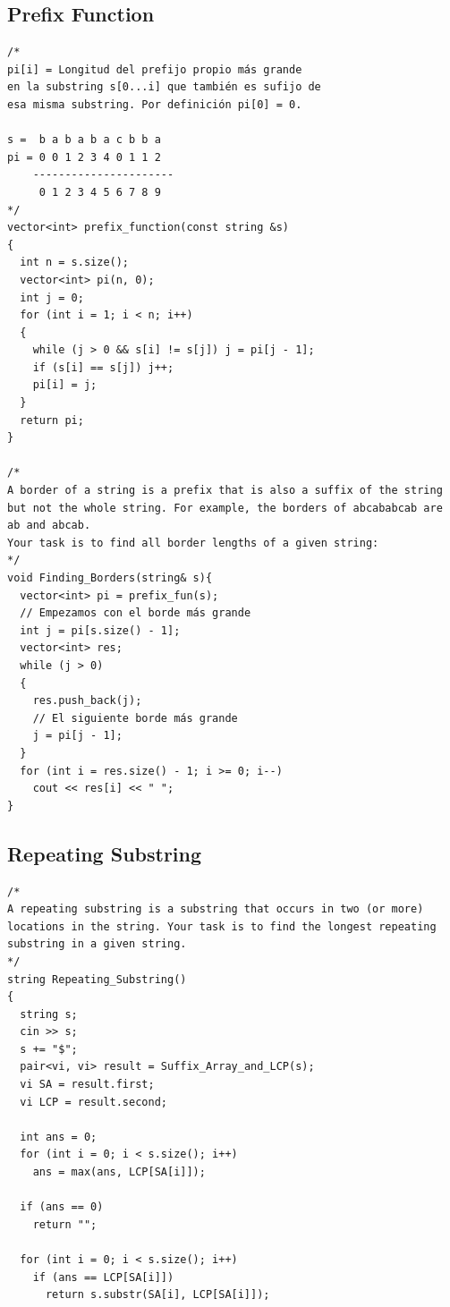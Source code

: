 \documentclass[twoside]{article}
\begin{document}
\begin{multicols*}{2}
	{
		\subsection*{Prefix Function}
	}
	\begin{verbatim}
/*
pi[i] = Longitud del prefijo propio más grande
en la substring s[0...i] que también es sufijo de 
esa misma substring. Por definición pi[0] = 0. 

s =  b a b a b a c b b a 
pi = 0 0 1 2 3 4 0 1 1 2 
    ----------------------
     0 1 2 3 4 5 6 7 8 9 
*/
vector<int> prefix_function(const string &s)
{
  int n = s.size();
  vector<int> pi(n, 0);
  int j = 0;
  for (int i = 1; i < n; i++)
  {
    while (j > 0 && s[i] != s[j]) j = pi[j - 1];
    if (s[i] == s[j]) j++;
    pi[i] = j;
  }
  return pi;
}

/*
A border of a string is a prefix that is also a suffix of the string but not the whole string. For example, the borders of abcababcab are ab and abcab.
Your task is to find all border lengths of a given string: 
*/
void Finding_Borders(string& s){
  vector<int> pi = prefix_fun(s);
  // Empezamos con el borde más grande
  int j = pi[s.size() - 1];
  vector<int> res;
  while (j > 0)
  {
    res.push_back(j);
    // El siguiente borde más grande 
    j = pi[j - 1];
  }
  for (int i = res.size() - 1; i >= 0; i--)
    cout << res[i] << " ";
}
\end{verbatim}

	{
		\subsection*{Repeating Substring}
	}
	\begin{verbatim}
/*
A repeating substring is a substring that occurs in two (or more) locations in the string. Your task is to find the longest repeating substring in a given string.
*/
string Repeating_Substring()
{
  string s;
  cin >> s;
  s += "$";
  pair<vi, vi> result = Suffix_Array_and_LCP(s);
  vi SA = result.first;
  vi LCP = result.second;

  int ans = 0;
  for (int i = 0; i < s.size(); i++)
    ans = max(ans, LCP[SA[i]]);

  if (ans == 0)
    return ""; 

  for (int i = 0; i < s.size(); i++)
    if (ans == LCP[SA[i]])
      return s.substr(SA[i], LCP[SA[i]]);
    

\end{verbatim}
\end{multicols*}
\end{document}
